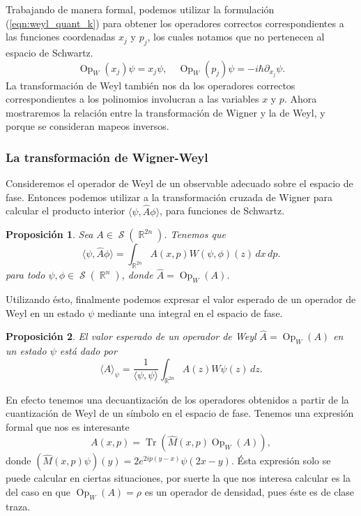 \documentclass[a4paper]{report}
\DeclareMathOperator{\R}{\mathbb{R}}
\DeclareMathOperator{\Sz}{\mathcal S}
\DeclareMathOperator{\Tr}{Tr}
\DeclareMathOperator{\Op}{Op}
\newtheorem{proposition}{Proposición}
\begin{document}
  Trabajando de manera formal, podemos utilizar la
  formulación (\ref{eqn:weyl_quant_k}) para obtener los
  operadores correctos correspondientes a las funciones
  coordenadas $x_j$ y $p_j$, los cuales notamos que no
  pertenecen al espacio de Schwartz.
  \begin{equation}
    \Op_W(x_j)\psi = x_j\psi,
    \quad
    \Op_W(p_j)\psi = -i\hbar \partial_{x_j}\psi.
  \end{equation}
  La transformación de Weyl también nos da los operadores
  correctos correspondientes a los polinomios involucran a
  las variables $x$ y $p$. Ahora mostraremos la relación
  entre la transformación de Wigner y la de Weyl, y porque
  se consideran mapeos inversos.

  \subsubsection{La transformación de Wigner-Weyl}

  Consideremos el operador de Weyl de un observable adecuado
  sobre el espacio de fase. Entonces podemos utilizar a la
  transformación cruzada de Wigner para calcular el producto
  interior $\langle \psi, \hat{A}\phi \rangle$, para
  funciones de Schwartz.
  \begin{proposition}
    \label{prop:wigner-weyl}
    Sea $A \in \Sz(\R^{2n})$. Tenemos que
    \begin{equation}
      \langle \psi, \hat{A}\phi \rangle
      = \int_{\R^{2n}} A(x,p)W(\psi,\phi)(z) \, dx \, dp.
    \end{equation}
    para todo $\psi, \phi \in \Sz(\R^{n})$, donde $\hat{A} =
    \Op_W(A)$.
  \end{proposition}
  Utilizando ésto, finalmente podemos expresar el valor
  esperado de un operador de Weyl en un estado $\psi$
  mediante una integral en el espacio de fase.
  \begin{proposition}
    El valor esperado de un operador de Weyl $\hat{A} =
    \Op_W(A)$ en un estado $\psi$ está dado por
    \begin{equation}
      \langle \hat{A} \rangle_\psi
      = \frac{1}{\langle \psi, \psi \rangle} 
      \int_{\R^{2n}} A(z) W\psi(z) \, dz.
    \end{equation}
  \end{proposition}  
  En efecto tenemos una decuantización de los operadores
  obtenidos a partir de la cuantización de Weyl de un
  símbolo en el espacio de fase. Tenemos una expresión
  formal que nos es interesante
  \begin{equation}
    A(x,p) = \Tr\left( \hat{M}(x,p) \Op_W(A) \right),
  \end{equation}
  donde $(\hat{M}(x,p)\psi)(y) = 2e^{2i p (y - x)}\psi(2x -
  y)$. Ésta expresión solo se puede calcular en ciertas
  situaciones, por suerte la que nos interesa calcular es la
  del caso en que $\Op_W(A) = \rho$ es un operador de
  densidad, pues éste es de clase traza.
\end{document}
